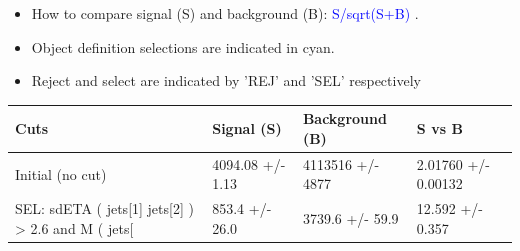 \documentclass[a4paper, 10pt]{article}
\begin{document}
\begin{itemize}
  \item How to compare signal (S) and background (B): \textcolor{blue}{S/\-sqrt(S+B)} .
   \item Object definition selections are indicated in cyan.  \item Reject and select are indicated by 'REJ' and 'SEL' respectively
\end{itemize}
\begin{table}[H]
  \begin{center}
    \begin{tabular}{|m{36.0mm}|m{36.0mm}|m{36.0mm}|m{33.0mm}|}
      \hline
      {\cellcolor{yellow}        Cuts}& {\cellcolor{yellow}         Signal (S)}& {\cellcolor{yellow}         Background (B)}& {\cellcolor{yellow}         S vs B}\\
      \hline
      {\cellcolor{white}         Initial (no cut)}& {\cellcolor{white}         4094.08 +/\-- 1.13}& {\cellcolor{white}         4113516 +/\-- 4877}& {\cellcolor{white}         2.01760 +/\-- 0.00132}\\
      \hline
      {\cellcolor{white} SEL: sdETA ( jets[1] jets[2] ) > 2.6 and M ( jets[}& {\cellcolor{white}         853.4 +/\-- 26.0}& {\cellcolor{white}         3739.6 +/\-- 59.9}& {\cellcolor{white}         12.592 +/\-- 0.357}\\
\hline
    \end{tabular}
  \end{center}
\end{table}
\end{document}
